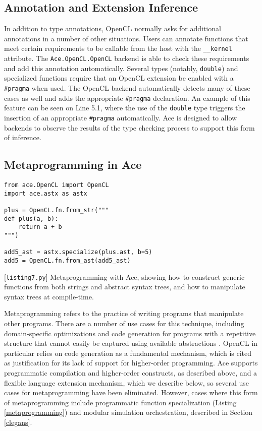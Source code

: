 \documentclass[10pt, conference, compsocconf]{IEEEtran}
\begin{document}
\subsection{Annotation and Extension Inference}
In addition to type annotations, OpenCL normally asks for additional annotations in a number of other situations.  Users can annotate functions that meet certain requirements to be callable from the host with the \verb|__kernel| attribute. The \verb|Ace.OpenCL.OpenCL| backend is able to check these requirements and add this annotation automatically. Several types (notably, \verb|double|) and specialized functions require that an OpenCL extension be enabled with a \verb|#pragma| when used. The OpenCL backend automatically detects many of these cases as well and adds the appropriate \verb|#pragma| declaration. An example of this feature can be seen on Line 5.1, where the use of the \verb|double| type triggers the insertion of an appropriate \verb|#pragma| automatically. Ace is designed to allow backends to observe the results of the type checking process to support this form of inference.

\subsection{Metaprogramming in Ace}
\begin{codelisting}
\begin{lstlisting}[commentstyle=\color{mauve}]
from ace.OpenCL import OpenCL
import ace.astx as astx

plus = OpenCL.fn.from_str("""
def plus(a, b):
    return a + b
""")

add5_ast = astx.specialize(plus.ast, b=5)
add5 = OpenCL.fn.from_ast(add5_ast)
\end{lstlisting}
\caption{[\texttt{listing7.py}] Metaprogramming with Ace, showing how to construct generic functions from both strings and abstract syntax trees, and how to manipulate syntax trees at compile-time.}
\label{metaprogramming}
\end{codelisting}
Metaprogramming refers to the practice of writing programs that manipulate other programs. There are a number of use cases for this technique, including domain-specific optimizations and code generation for programs with a repetitive structure that cannot easily be captured using available abstractions \cite{pyopencl}. OpenCL in particular relies on code generation as a fundamental mechanism, which is cited as justification for its lack of support for higher-order programming. Ace supports programmatic compilation and higher-order constructs, as described above, and a flexible language extension mechanism, which we describe below, so several use cases for metaprogramming have been eliminated. However, cases where this form of metaprogramming include programmatic function specialization (Listing \ref{metaprogramming}) and modular simulation orchestration, described in Section \ref{clegans}.
\end{document}
